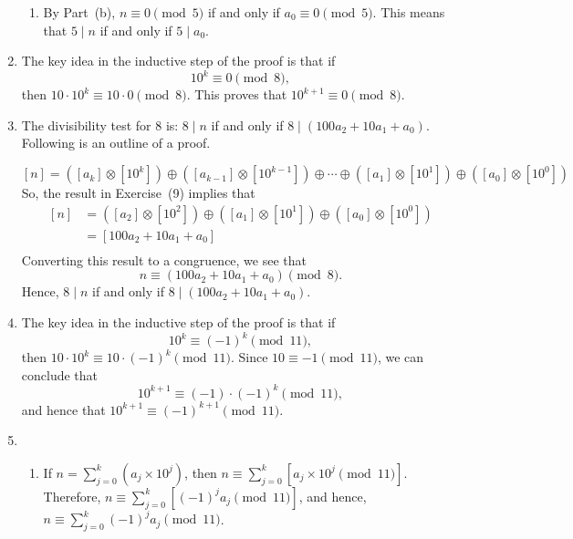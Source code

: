 \begin{enumerate}
\begin{enumerate}
\item By Part~(b),  $n \equiv 0 \pmod 5$  if and only if  
$ {a_0 }  \equiv 0 \pmod 5$.  This means that $5 \mid n$ if and only if  
$5 \mid  {a_0 } $.
\end{enumerate}

\item The key idea in the inductive step of the proof is that if
\[
10^k \equiv 0 \pmod 8,
\]
then $10 \cdot 10^k \equiv 10 \cdot 0 \pmod 8$.  This proves that $10^{k+1} \equiv 0 \pmod 8$.

\item The divisibility test for 8 is:   $8 \mid n$ if and only if  
$8 \mid \left( {100a_2 + 10a_1  + a_0 } \right)$.  Following is an outline of a proof.

\[
  \left[ n \right] = \left( {\left[ {a_k } \right] \otimes \left[ {10^k } \right]} \right) \oplus \left( {\left[ {a_{k - 1} } \right] \otimes \left[ {10^{k - 1} } \right]} \right) \oplus  \cdots  \oplus \left( {\left[ {a_1 } \right] \otimes \left[ {10^1 } \right]} \right) \oplus \left( {\left[ {a_0 } \right] \otimes \left[ {10^0 } \right]} \right)
\]
So, the result in Exercise~(9) implies that
\[
\begin{aligned}
  \left[ n \right] &= \left( {\left[ {a_2 } \right] \otimes \left[ {10^2 } \right]} \right) \oplus \left( {\left[ {a_1 } \right] \otimes \left[ {10^1 } \right]} \right) \oplus \left( {\left[ {a_0 } \right] \otimes \left[ {10^0 } \right]} \right) \\ 
   &= \left[ {100a_2 + 10a_1  + a_0 } \right] \\ 
\end{aligned}
\]
Converting this result to a congruence, we see that  
\[
n \equiv \left( {100a_2 + 10a_1  + a_0 } \right) \pmod 8.
\]
Hence, $8 \mid n$ if and only if $8 \mid \left( {100a_2 + 10a_1  + a_0 } \right)$.

\item The key idea in the inductive step of the proof is that if
\[
10^k \equiv \left( -1 \right)^k \pmod {11},
\]
then $10 \cdot 10^k \equiv 10 \cdot \left( -1 \right)^k \pmod {11}$.  Since 
$10 \equiv -1 \pmod {11}$, we can conclude that
\[
10^{k+1} \equiv \left( -1 \right) \cdot \left( -1 \right)^k \pmod {11},
\]
and hence that $10^{k+1} \equiv \left( -1 \right)^{k+1} \pmod {11}$.

\item \begin{enumerate}
\item If  $n = \sum\limits_{j = 0}^k \left( {a_j \times 10^j} \right)$, then 
$n \equiv \sum\limits_{j = 0}^k \left[ { a_j \times 10^j \pmod {11}} \right]$. Therefore,  
$n \equiv \sum\limits_{j = 0}^k \left[ {\left( { - 1} \right)^j a_j } \pmod {11} \right]$, and hence, \\$n \equiv \sum\limits_{j = 0}^k {\left( { - 1} \right)^j a_j } \pmod {11}$.


\end{enumerate}
\end{enumerate}

